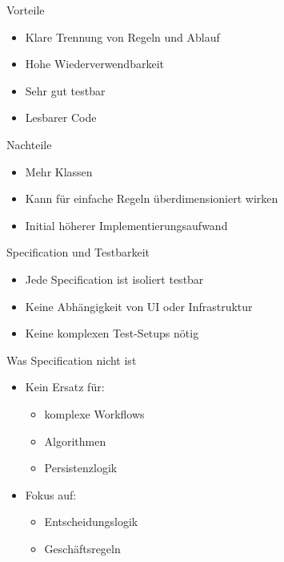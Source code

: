 \begin{frame}{Vorteile}
	\begin{itemize}
	  \item Klare Trennung von Regeln und Ablauf
	  \item Hohe Wiederverwendbarkeit
	  \item Sehr gut testbar
	  \item Lesbarer Code
	\end{itemize}
\end{frame}

\begin{frame}{Nachteile}
	\begin{itemize}
	  \item Mehr Klassen
	  \item Kann für einfache Regeln überdimensioniert wirken
	  \item Initial höherer Implementierungsaufwand
	\end{itemize}
\end{frame}

\begin{frame}{Specification und Testbarkeit}
	\begin{itemize}
	  \item Jede Specification ist isoliert testbar
	  \item Keine Abhängigkeit von UI oder Infrastruktur
	  \item Keine komplexen Test-Setups nötig
	\end{itemize}
\end{frame}

\begin{frame}{Was Specification nicht ist}
	\begin{itemize}
	  \item Kein Ersatz für:
	  \begin{itemize}
	    \item komplexe Workflows
	    \item Algorithmen
	    \item Persistenzlogik
	  \end{itemize}
	  \item Fokus auf:
	  \begin{itemize}
	    \item Entscheidungslogik
	    \item Geschäftsregeln
	  \end{itemize}
	\end{itemize}
\end{frame}

